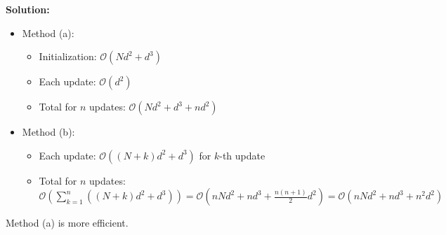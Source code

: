 \documentclass[a3paper,12pt]{extarticle} %
\begin{document}
\begin{enumerate}
\begin{enumerate}
            \textbf{Solution:}
            \begin{itemize}
                \item Method (a):
                \begin{itemize}
                    \item Initialization: \( \mathcal{O}(Nd^2 + d^3) \)
                    \item Each update: \( \mathcal{O}(d^2) \)
                    \item Total for \( n \) updates: \( \mathcal{O}(Nd^2 + d^3 + nd^2) \)
                \end{itemize}
                \item Method (b):
                \begin{itemize}
                    \item Each update: \( \mathcal{O}((N+k)d^2 + d^3) \) for \( k \)-th update
                    \item Total for \( n \) updates: \( \mathcal{O}(\sum_{k=1}^n ((N+k)d^2 + d^3)) = \mathcal{O}(nNd^2 + nd^3 + \frac{n(n+1)}{2}d^2) = \mathcal{O}(nNd^2 + nd^3 + n^2d^2) \)
                \end{itemize}
            \end{itemize}
            Method (a) is more efficient.
        \end{enumerate}
\end{enumerate}
\end{document}
